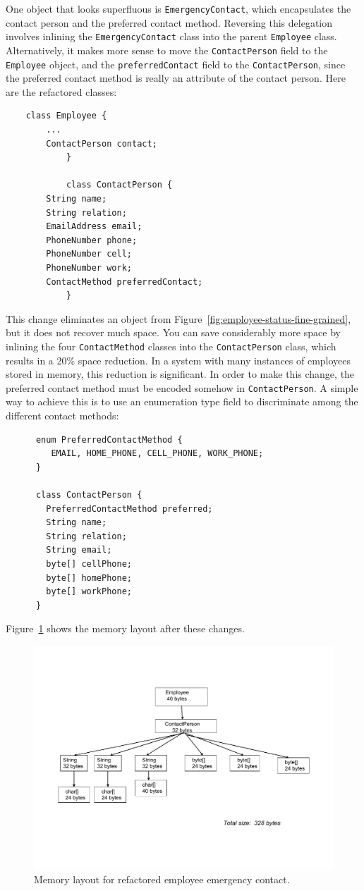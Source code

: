 One object that looks superfluous is \texttt{EmergencyContact}, which encapsulates the contact person and the preferred contact method.  
Reversing this delegation involves inlining the \texttt{EmergencyContact} class into the parent \texttt{Employee} class. Alternatively, it makes more sense to move the \texttt{ContactPerson} field to the \texttt{Employee} object, and the \texttt{preferredContact} field to the \texttt{ContactPerson}, since the preferred contact method is really an attribute of the contact person. Here are the refactored classes:
\ttfamily
\begin{verbatim}
	class Employee {
        ...
        ContactPerson contact;
			}
			
			class ContactPerson {
        String name;
        String relation;
        EmailAddress email;
        PhoneNumber phone;
        PhoneNumber cell;
        PhoneNumber work;
        ContactMethod preferredContact;
			}
\end{verbatim}
\normalfont
This change eliminates an object from Figure~\ref{fig:employee-status-fine-grained}, but it does not recover much space. You can save considerably more space by inlining the four \texttt{ContactMethod} classes into the \texttt{ContactPerson} class, which results in a 20\%  space reduction. In a system with many instances of employees stored in memory, this reduction is significant. In order to make this change, the preferred contact method must be encoded somehow in \texttt{ContactPerson}.  A simple way to achieve this is to use an enumeration type field to discriminate among the different contact methods:
\ttfamily
\begin{verbatim} 
      enum PreferredContactMethod {
         EMAIL, HOME_PHONE, CELL_PHONE, WORK_PHONE;
      }
      
      class ContactPerson {
        PreferredContactMethod preferred;
        String name;
        String relation;
        String email;
        byte[] cellPhone;
        byte[] homePhone;
        byte[] workPhone;
      }		
\end{verbatim}
\normalfont
Figure~\ref{fig:refactored-fine-grain} shows the memory layout after these changes.
 \begin{figure}
  \centering
 \includegraphics[width=.70\textwidth]{Figures/chapter4/refactored-fine-grain.pdf}
  \caption{Memory layout for refactored employee emergency contact.}
  \label{fig:refactored-fine-grain}
\end{figure}

